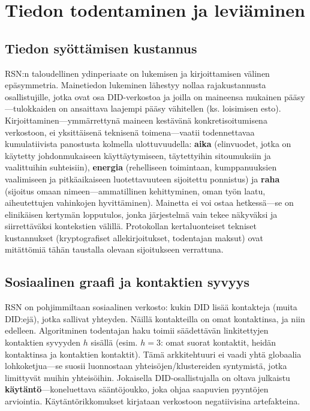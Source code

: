 \documentclass[11pt,a4paper,twocolumn]{article}
\begin{document}
\section{Tiedon todentaminen ja leviäminen}

\subsection{Tiedon syöttämisen kustannus}

RSN:n taloudellinen ydinperiaate on lukemisen ja kirjoittamisen välinen epäsymmetria. Mainetiedon lukeminen lähestyy nollaa rajakustannusta osallistujille, jotka ovat osa DID-verkostoa ja joilla on maineensa mukainen pääsy---tulokkaiden on ansaittava laajempi pääsy vähitellen (ks. loisimisen esto). Kirjoittaminen---ymmärrettynä maineen kestävänä konkretisoitumisena verkostoon, ei yksittäisenä teknisenä toimena---vaatii todennettavaa kumulatiivista panostusta kolmella ulottuvuudella: \textbf{aika} (elinvuodet, jotka on käytetty johdonmukaiseen käyttäytymiseen, täytettyihin sitoumuksiin ja vaalittuihin suhteisiin), \textbf{energia} (rehelliseen toimintaan, kumppanuuksien vaalimiseen ja pitkäaikaiseen luotettavuuteen sijoitettu ponnistus) ja \textbf{raha} (sijoitus omaan nimeen---ammatillinen kehittyminen, oman työn laatu, aiheutettujen vahinkojen hyvittäminen). Mainetta ei voi ostaa hetkessä---se on elinikäisen kertymän lopputulos, jonka järjestelmä vain tekee näkyväksi ja siirrettäväksi kontekstien välillä. Protokollan kertaluonteiset tekniset kustannukset (kryptografiset allekirjoitukset, todentajan maksut) ovat mitättömiä tähän taustalla olevaan sijoitukseen verrattuna.

\subsection{Sosiaalinen graafi ja kontaktien syvyys}

RSN on pohjimmiltaan sosiaalinen verkosto: kukin DID lisää kontakteja (muita DID:ejä), jotka sallivat yhteyden. Näillä kontakteilla on omat kontaktinsa, ja niin edelleen. Algoritminen todentajan haku toimii säädettävän linkitettyjen kontaktien syvyyden $h$ sisällä (esim. $h=3$: omat suorat kontaktit, heidän kontaktinsa ja kontaktien kontaktit). Tämä arkkitehtuuri ei vaadi yhtä globaalia lohkoketjua---se suosii luonnostaan yhteisöjen/klustereiden syntymistä, jotka limittyvät muihin yhteisöihin. Jokaisella DID-osallistujalla on oltava julkaistu \textbf{käytäntö}---koneluettava sääntöjoukko, joka ohjaa saapuvien pyyntöjen arviointia. Käytäntörikkomukset kirjataan verkostoon negatiivisina artefakteina.
\end{document}
